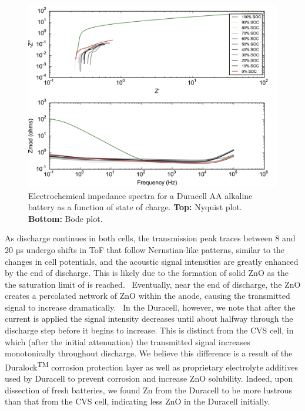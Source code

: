 \begin{figure}[htb]
  \centering
    \includegraphics[width=\textwidth]{ch4-bw/images/eis.png}
    \caption[Electrochemical impedance spectra for a Duracell AA alkaline battery.]{Electrochemical impedance spectra for a Duracell AA alkaline battery as a function of state of charge. \textbf{Top:} Nyquist plot. \textbf{Bottom:} Bode plot.}
    \label{fig:bweis}
\end{figure}

As discharge continues in both cells, the transmission peak traces between 8 and 20 µs undergo shifts in ToF that follow Nernstian-like patterns, similar to the changes in cell potentials, and the acoustic signal intensities are greatly enhanced by the end of discharge. This is likely due to the formation of solid ZnO as the the saturation limit of  is reached.~\cite{Dirkse1954-di,Szpak1979-qy} Eventually, near the end of discharge, the ZnO creates a percolated network of ZnO within the anode, causing the transmitted signal to increase dramatically.~\cite{Bhadra2015-aq} In the Duracell, however, we note that after the current is applied the signal intensity decreases until about halfway through the discharge step before it begins to increase. This is distinct from the CVS cell, in which (after the initial attenuation) the transmitted signal increases monotonically throughout discharge. We believe this difference is a result of the Duralock\textsuperscript{TM} corrosion protection layer as well as proprietary electrolyte additives used by Duracell to prevent corrosion and increase ZnO solubility. Indeed, upon dissection of fresh batteries, we found Zn from the Duracell to be more lustrous than that from the CVS cell, indicating less ZnO in the Duracell initially. 

